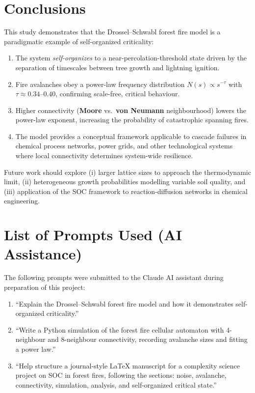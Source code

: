 \documentclass[12pt,a4paper]{article}
\begin{document}
\section{Conclusions}
\label{sec:conclusions}

This study demonstrates that the Drossel--Schwabl forest fire model is a
paradigmatic example of self-organized criticality:

\begin{enumerate}
  \item The system \emph{self-organizes} to a near-percolation-threshold
        state driven by the separation of timescales between tree growth
        and lightning ignition.
  \item Fire avalanches obey a power-law frequency distribution
        $N(s)\propto s^{-\tau}$ with $\tau \approx 0.34$--$0.40$,
        confirming scale-free, critical behaviour.
  \item Higher connectivity (\textbf{Moore} vs.\ \textbf{von Neumann}
        neighbourhood) lowers the power-law exponent, increasing the
        probability of catastrophic spanning fires.
  \item The model provides a conceptual framework applicable to cascade
        failures in chemical process networks, power grids, and other
        technological systems where local connectivity determines
        system-wide resilience.
\end{enumerate}

Future work should explore (i) larger lattice sizes to approach the
thermodynamic limit, (ii) heterogeneous growth probabilities modelling
variable soil quality, and (iii) application of the SOC framework to
reaction-diffusion networks in chemical engineering.

\section*{List of Prompts Used (AI Assistance)}

The following prompts were submitted to the Claude AI assistant during
preparation of this project:

\begin{enumerate}
  \item ``Explain the Drossel--Schwabl forest fire model and how it
        demonstrates self-organized criticality.''
  \item ``Write a Python simulation of the forest fire cellular automaton
        with 4-neighbour and 8-neighbour connectivity, recording avalanche
        sizes and fitting a power law.''
  \item ``Help structure a journal-style LaTeX manuscript for a complexity
        science project on SOC in forest fires, following the sections:
        noise, avalanche, connectivity, simulation, analysis, and
        self-organized critical state.''
\end{enumerate}
\end{document}
